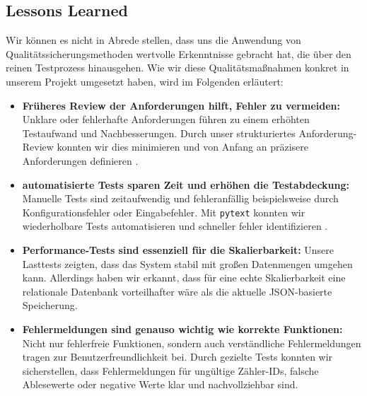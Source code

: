 \subsection{Lessons Learned}\label{subsec:lessons-learned}

Wir können es nicht in Abrede stellen, dass uns die Anwendung von Qualitätssicherungsmethoden wertvolle Erkenntnisse gebracht hat, die über den reinen Testprozess hinausgehen.
Wie wir diese Qualitätsmaßnahmen konkret in unserem Projekt umgesetzt haben, wird im Folgenden erläutert:

\begin{itemize}
    \item \textbf{Früheres Review der Anforderungen hilft, Fehler zu vermeiden:} Unklare oder fehlerhafte Anforderungen führen zu einem erhöhten Testaufwand und Nachbesserungen.
    Durch unser strukturiertes Anforderung-Review konnten wir dies minimieren und von Anfang an präzisere Anforderungen definieren \cite{DaiglGlunz2024}.
    \item \textbf{automatisierte Tests sparen Zeit und erhöhen die Testabdeckung:} Manuelle Tests sind zeitaufwendig und fehleranfällig beispielsweise durch Konfigurationsfehler oder Eingabefehler.
    Mit \texttt{pytext} konnten wir wiederholbare Tests automatisieren und schneller fehler identifizieren \cite{Röttgeretal2024}.
    \item \textbf{Performance-Tests sind essenziell für die Skalierbarkeit:} Unsere Lasttests zeigten, dass das System stabil mit großen Datenmengen umgehen kann.
    Allerdings haben wir erkannt, dass für eine echte Skalierbarkeit eine relationale Datenbank vorteilhafter wäre als die aktuelle JSON-basierte Speicherung.
    \item \textbf{Fehlermeldungen sind genauso wichtig wie korrekte Funktionen:} Nicht nur fehlerfreie Funktionen, sondern auch verständliche Fehlermeldungen tragen zur Benutzerfreundlichkeit bei.
    Durch gezielte Tests konnten wir sicherstellen, dass Fehlermeldungen für ungültige Zähler-IDs, falsche Ablesewerte oder negative Werte klar und nachvollziehbar sind.
\end{itemize}
